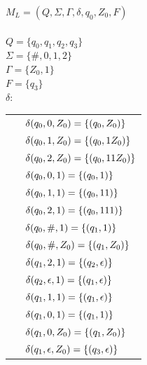 \documentclass[11pt,a4paper]{article}
\begin{document}
$M_L = (Q,\Sigma,\Gamma,\delta,q_0,Z_0,F)$\\
\\
$Q = \{q_0,q_1,q_2,q_3\}$\\
$\Sigma = \{\#,0,1,2\}$\\
$\Gamma = \{Z_0,1\}$\\
$F = \{q_3\}$\\
$\delta$:\\
\begin{tabular}{l}
$\hspace{1.5em}\delta(q_0,0,Z_0)=\{(q_0,Z_0)\}$\\
$\hspace{1.5em}\delta(q_0,1,Z_0)=\{(q_0,1Z_0)\}$\\
$\hspace{1.5em}\delta(q_0,2,Z_0)=\{(q_0,11Z_0)\}$\\
$\hspace{1.5em}\delta(q_0,0,1)=\{(q_0,1)\}$\\
$\hspace{1.5em}\delta(q_0,1,1)=\{(q_0,11)\}$\\
$\hspace{1.5em}\delta(q_0,2,1)=\{(q_0,111)\}$\\
$\hspace{1.5em}\delta(q_0,\#,1)=\{(q_1,1)\}$\\
$\hspace{1.5em}\delta(q_0,\#,Z_0)=\{(q_1,Z_0)\}$\\
$\hspace{1.5em}\delta(q_1,2,1)=\{(q_2,\epsilon)\}$\\
$\hspace{1.5em}\delta(q_2,\epsilon,1)=\{(q_1,\epsilon)\}$\\
$\hspace{1.5em}\delta(q_1,1,1)=\{(q_1,\epsilon)\}$\\
$\hspace{1.5em}\delta(q_1,0,1)=\{(q_1,1)\}$\\
$\hspace{1.5em}\delta(q_1,0,Z_0)=\{(q_1,Z_0)\}$\\
$\hspace{1.5em}\delta(q_1,\epsilon,Z_0)=\{(q_3,\epsilon)\}$\\
\end{tabular}
\end{document}
